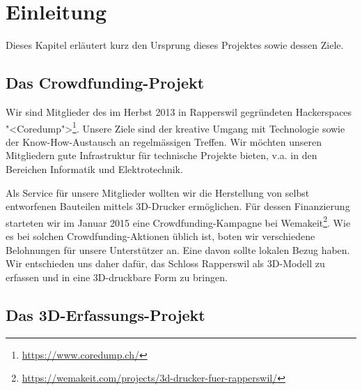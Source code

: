 \chapter{Einleitung}

\label{ch:einleitung}


Dieses Kapitel erläutert kurz den Ursprung dieses Projektes sowie dessen Ziele.


\section{Das Crowdfunding-Projekt}\label{sec:crowdfunding}

Wir sind Mitglieder des im Herbst 2013 in Rapperswil gegründeten Hackerspaces
"<Coredump">\footnote{\url{https://www.coredump.ch/}}. Unsere Ziele sind der
kreative Umgang mit Technologie sowie der Know-How-Austausch an regelmässigen
Treffen. Wir möchten unseren Mitgliedern gute Infrastruktur für technische
Projekte bieten, v.a. in den Bereichen Informatik und Elektrotechnik.


Als Service für unsere Mitglieder wollten wir die Herstellung von selbst
entworfenen Bauteilen mittels 3D-Drucker ermöglichen. Für dessen Finanzierung
starteten wir im Januar 2015 eine Crowdfunding-Kampagne bei
Wemakeit\footnote{\url{https://wemakeit.com/projects/3d-drucker-fuer-rapperswil/}}.
Wie es bei solchen Crowdfunding-Aktio\-nen üblich ist, boten wir verschiedene
Belohnungen für unsere Unterstützer an. Eine davon sollte lokalen Bezug haben.
Wir entschieden uns daher dafür, das Schloss Rapperswil als 3D-Modell zu
erfassen und in eine 3D-druckbare Form zu bringen.


\section{Das 3D-Erfassungs-Projekt}\label{sec:3d-project}

